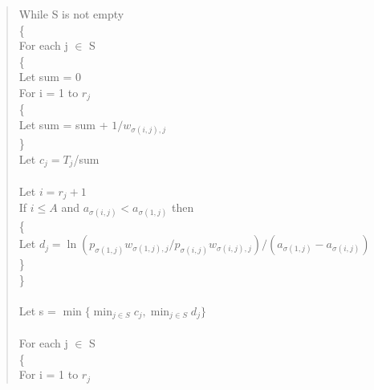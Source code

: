 \begin{quote}
  While S is not empty\\
  \{\\
      \hbox{\hspace{5mm}}For each j $\in$ S\\
      \hbox{\hspace{5mm}}\{\\
          \hbox{\hspace{1cm}}Let sum = 0\\
          \hbox{\hspace{1cm}}For i = 1 to $r_j$\\
          \hbox{\hspace{1cm}}\{\\
          \hbox{\hspace{15mm}}Let sum = sum + $1/w_{\sigma(i,j),j}$\\ 
          \hbox{\hspace{1cm}}\}\\
          \hbox{\hspace{1cm}}Let $c_j = T_j$/sum\\\\
          \hbox{\hspace{1cm}}Let $i = r_j + 1$\\
          \hbox{\hspace{1cm}}If $i \le A$ and $a_{\sigma(i,j)} < a_{\sigma(1,j)}$ then\\
          \hbox{\hspace{1cm}}\{\\
          \hbox{\hspace{15mm}}Let $d_j = \ln(p_{\sigma(1,j)}w_{\sigma(1,j),j}/p_{\sigma(i,j)}w_{\sigma(i,j),j})/(a_{\sigma(1,j)} - a_{\sigma(i,j)})$\\
          \hbox{\hspace{1cm}}\}\\
       \hbox{\hspace{5mm}}\}\\\\
       \hbox{\hspace{5mm}}Let s = $\min\{\min_{j\in S} c_j, \min_{j\in S} d_j\}$\\\\
       \hbox{\hspace{5mm}}For each j $\in$ S\\
       \hbox{\hspace{5mm}}\{\\
       \hbox{\hspace{1cm}}For i = 1 to $r_j$\\

\end{quote}

